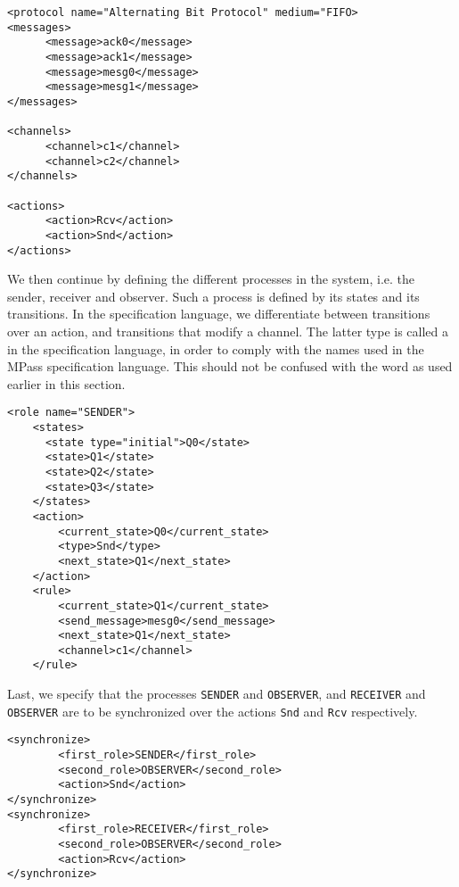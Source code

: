 \lstset{language=XML}
\begin{lstlisting}[frame=single]
<protocol name="Alternating Bit Protocol" medium="FIFO>
<messages>
      <message>ack0</message>
      <message>ack1</message>
      <message>mesg0</message>
      <message>mesg1</message>
</messages>

<channels>
      <channel>c1</channel>
      <channel>c2</channel>
</channels>

<actions>
      <action>Rcv</action>
      <action>Snd</action>
</actions>
\end{lstlisting}

We then continue by defining the different processes in the system, i.e. the sender, receiver and observer. Such a process is defined by its states and its transitions. In the specification language, we differentiate between transitions over an action, and transitions that modify a channel. The latter type is called a  in the specification language, in order to comply with the names used in the MPass specification language. This should not be confused with the word as used earlier in this section.

\begin{lstlisting}[frame=single]
  <role name="SENDER">
    <states>
      <state type="initial">Q0</state>
      <state>Q1</state>
      <state>Q2</state>
      <state>Q3</state>
    </states>
    <action>
        <current_state>Q0</current_state>
        <type>Snd</type>
        <next_state>Q1</next_state>
    </action>
    <rule>
        <current_state>Q1</current_state>
        <send_message>mesg0</send_message>
        <next_state>Q1</next_state>
        <channel>c1</channel>
    </rule>
\end{lstlisting}

Last, we specify that the processes \texttt{SENDER} and \texttt{OBSERVER}, and  \texttt{RECEIVER} and \texttt{OBSERVER} are to be synchronized over the actions \texttt{Snd} and \texttt{Rcv} respectively.

\begin{lstlisting}[frame=single]
<synchronize>
        <first_role>SENDER</first_role>
        <second_role>OBSERVER</second_role>
        <action>Snd</action>
</synchronize>
<synchronize>
        <first_role>RECEIVER</first_role>
        <second_role>OBSERVER</second_role>
        <action>Rcv</action>
</synchronize>
\end{lstlisting}
